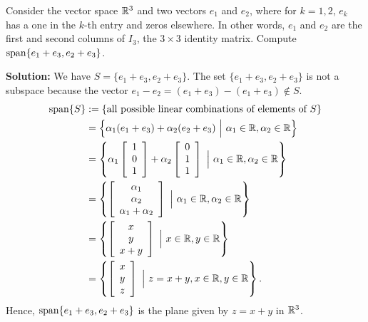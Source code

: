 \begin{example}
\label{ex:Span01} Consider the vector space $\mathbb R^3$ and two vectors $e_1$ and $e_2$, where for $k=1,2$, $e_k$ has a one in the $k$-th entry and zeros elsewhere. In other words, $e_1$ and $e_2$ are the first and second columns of $I_3$, the $ 3\times 3$ identity matrix. Compute $\mathrm{span} \{ e_1+e_3, e_2+e_3 \}$.
 \end{example}

\textbf{Solution:} We have $S=\{ e_1+e_3, e_2+e_3\}.$ The set $\{ e_1+e_3, e_2+e_3\}$ is not a subspace because the vector $e_1 -e_2 = (e_1+e_3) - (e_1 + e_3) \not \in S$. 
\begin{align*}
    \mathrm{span} \{ S \}&:=\{ \text{all possible linear combinations of elements of}~S \} \\
    &= \left\{ \alpha_1 (e_1+ e_3) + \alpha _2 (e_2+e_3)~\Big|~ \alpha_1\in \mathbb R, \alpha_2 \in \mathbb R \right\} \\
    &=  \left\{ \alpha_1 \left[\begin{array}{c}  1\\ 0 \\ 1 \end{array} \right] + \alpha_2 \left[\begin{array}{c}  0 \\ 1 \\ 1 \end{array} \right]~\Big|~ \alpha_1 \in \mathbb R, \alpha_2 \in \mathbb R \right\} \\
    & =\left\{  \left[\begin{array}{c}  \alpha_1\\ \alpha_2 \\ \alpha_1 + \alpha_2 \end{array} \right] ~\Big|~ \alpha_1\in \mathbb R, \alpha_2 \in \mathbb R \right\} \\
    & =\left\{  \left[\begin{array}{c}  x\\ y\\ x+y \end{array} \right] ~\Big|~ x\in \mathbb R, y \in \mathbb R \right\} \\
      & =\left\{  \left[\begin{array}{c}  x\\ y\\ z \end{array} \right] ~\Big|~ z = x+y, x\in \mathbb R, y \in \mathbb R \right\}. 
\end{align*}
Hence,  $\mathrm{span} \{ e_1+e_3, e_2+e_3 \}$ is the plane given by $z = x+y$ in $\mathbb R^3$. \Qed\\

